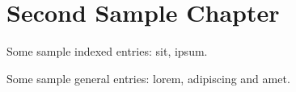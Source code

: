 \chapter{Second Sample Chapter}

Some sample indexed entries: \gls{sit}, \gls{ipsum}.

Some sample general entries: \gls{lorem}, \gls{adipiscing} and \gls{amet}.
